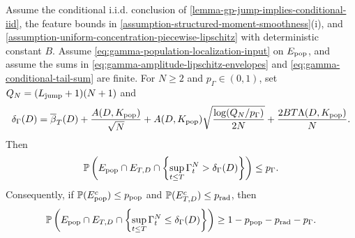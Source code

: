 \begin{lemma}
\label{lemma-uniform-sup-gamma-bound-localized-conditional}
Assume the conditional i.i.d. conclusion of
\cref{lemma-gp-jump-implies-conditional-iid}, the feature bounds in
\cref{assumption-structured-moment-smoothness}(i), and
\cref{assumption-uniform-concentration-piecewise-lipschitz}
with deterministic constant $B$.  Assume
\eqref{eq:gamma-population-localization-input} on $E_{\rm pop}$,
and assume the sums in
\eqref{eq:gamma-amplitude-lipschitz-envelopes} and
\eqref{eq:gamma-conditional-tail-sum} are finite.
For $N\ge2$ and $p_\Gamma\in(0,1)$, set $Q_N=(L_{\mathrm{jump}}+1)(N+1)$ and
\begin{equation}
\label{eq:gamma-explicit-envelope}
 \delta_\Gamma(D)=\overline\beta_T(D)
 +\frac{A(D,K_{\rm pop})}{\sqrt N}
 +A(D,K_{\rm pop})\sqrt{\frac{\log(Q_N/p_\Gamma)}{2N}}
 +\frac{2BT\Lambda(D,K_{\rm pop})}{N}.
\end{equation}
Then
\begin{equation}
\label{eq:gamma-localized-probability}
 \mathbb P\left(
  E_{\rm pop}\cap E_{T,D}\cap
  \left\{\sup_{t\le T}\Gamma_t^N>\delta_\Gamma(D)\right\}
 \right)\le p_\Gamma.
\end{equation}
Consequently, if
$\mathbb P(E_{\rm pop}^c)\le p_{\rm pop}$ and
$\mathbb P(E_{T,D}^c)\le p_{\rm rad}$, then
\[
 \mathbb P\left(
  E_{\rm pop}\cap E_{T,D}\cap
  \left\{\sup_{t\le T}\Gamma_t^N\le\delta_\Gamma(D)\right\}
 \right)\ge1-p_{\rm pop}-p_{\rm rad}-p_\Gamma.
\]
\end{lemma}

